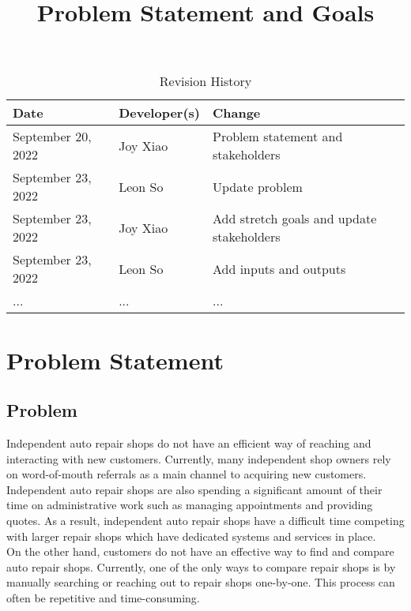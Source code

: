 \documentclass{article}
\title{Problem Statement and Goals\\\progname}
\author{\authname}
\date{}
\begin{document}
\maketitle

\begin{table}[hp]
\caption{Revision History} \label{TblRevisionHistory}
\begin{tabularx}{\textwidth}{llX}
\toprule
\textbf{Date} & \textbf{Developer(s)} & \textbf{Change}\\
\midrule
September 20, 2022 & Joy Xiao & Problem statement and stakeholders\\
September 23, 2022 & Leon So & Update problem\\
September 23, 2022 & Joy Xiao & Add stretch goals and update stakeholders\\
September 23, 2022 & Leon So & Add inputs and outputs\\
... & ... & ...\\
\bottomrule
\end{tabularx}
\end{table}

\section{Problem Statement}


\subsection{Problem}
Independent auto repair shops do not have an efficient way of reaching and interacting with new customers.
Currently, many independent shop owners rely on word-of-mouth referrals as a main channel to acquiring new customers. 
Independent auto repair shops are also spending a significant amount of their time on administrative work such as 
managing appointments and providing quotes. As a result, independent auto repair shops have a difficult time 
competing with larger repair shops which have dedicated systems and services in place.\\

On the other hand, customers do not have an effective way to find and compare auto repair shops. 
Currently, one of the only ways to compare repair shops is by manually searching or reaching out to repair shops one-by-one. 
This process can often be repetitive and time-consuming.
\end{document}
